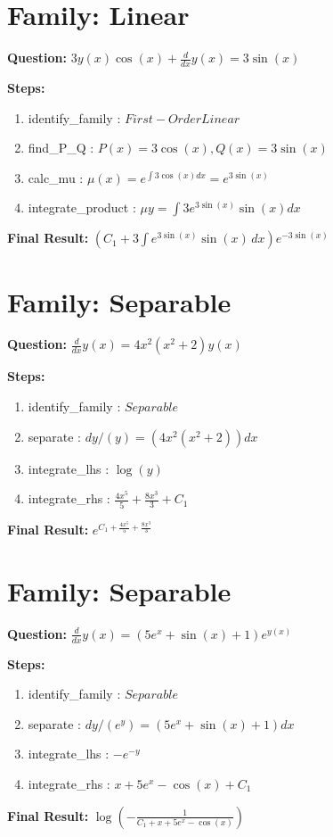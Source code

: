 \documentclass{article}
\begin{document}
\section*{Family: Linear}
\textbf{Question:} $3 y{\left(x \right)} \cos{\left(x \right)} + \frac{d}{d x} y{\left(x \right)} = 3 \sin{\left(x \right)}$

\textbf{Steps:}
\begin{enumerate}
\item identify_family :  $First-Order Linear$
\item find_P_Q :  $P(x)=3 \cos{\left(x \right)}, Q(x)=3 \sin{\left(x \right)}$
\item calc_mu :  $\mu(x) = e^{\int 3 \cos{\left(x \right)} dx} = e^{3 \sin{\left(x \right)}}$
\item integrate_product :  $\mu y = \int 3 e^{3 \sin{\left(x \right)}} \sin{\left(x \right)} dx$
\end{enumerate}
\textbf{Final Result:} $\left(C_{1} + 3 \int e^{3 \sin{\left(x \right)}} \sin{\left(x \right)}\, dx\right) e^{- 3 \sin{\left(x \right)}}$

\section*{Family: Separable}
\textbf{Question:} $\frac{d}{d x} y{\left(x \right)} = 4 x^{2} \left(x^{2} + 2\right) y{\left(x \right)}$

\textbf{Steps:}
\begin{enumerate}
\item identify_family :  $Separable$
\item separate :  $dy / (y) = (4 x^{2} \left(x^{2} + 2\right)) dx$
\item integrate_lhs :  $\log{\left(y \right)}$
\item integrate_rhs :  $\frac{4 x^{5}}{5} + \frac{8 x^{3}}{3} + C_1$
\end{enumerate}
\textbf{Final Result:} $e^{C_{1} + \frac{4 x^{5}}{5} + \frac{8 x^{3}}{3}}$

\section*{Family: Separable}
\textbf{Question:} $\frac{d}{d x} y{\left(x \right)} = \left(5 e^{x} + \sin{\left(x \right)} + 1\right) e^{y{\left(x \right)}}$

\textbf{Steps:}
\begin{enumerate}
\item identify_family :  $Separable$
\item separate :  $dy / (e^{y}) = (5 e^{x} + \sin{\left(x \right)} + 1) dx$
\item integrate_lhs :  $- e^{- y}$
\item integrate_rhs :  $x + 5 e^{x} - \cos{\left(x \right)} + C_1$
\end{enumerate}
\textbf{Final Result:} $\log{\left(- \frac{1}{C_{1} + x + 5 e^{x} - \cos{\left(x \right)}} \right)}$
\end{document}
